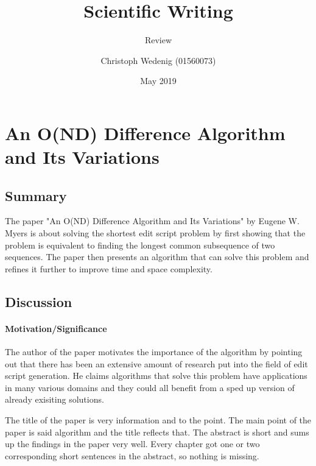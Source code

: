 \documentclass{scrartcl}
\title{Scientific Writing}
\subtitle{Review}
\author{Christoph Wedenig (01560073)}
\date{May 2019}
\begin{document}
\maketitle

\section{An O(ND) Difference Algorithm and Its Variations}

\subsection{Summary}
The paper "An O(ND) Difference Algorithm and Its Variations" by Eugene W. Myers is about solving the shortest edit script problem by first showing that the problem is equivalent to finding the longest common subsequence of two sequences. The paper then presents an algorithm that can solve this problem and refines it further to improve time and space complexity.

\subsection{Discussion}
\paragraph{Motivation/Significance}{
The author of the paper motivates the importance of the algorithm by pointing out that there has been an extensive amount of research put into the field of edit script generation. He claims algorithms that solve this problem have applications in many various domains and they could all benefit from a sped up version of already exisiting solutions.
}

The title of the paper is very information and to the point. The main point of the paper is said algorithm and the title reflects that.
The abstract is short and sums up the findings in the paper very well. Every chapter got one or two corresponding short sentences in the abstract, so nothing is missing.
\end{document}
